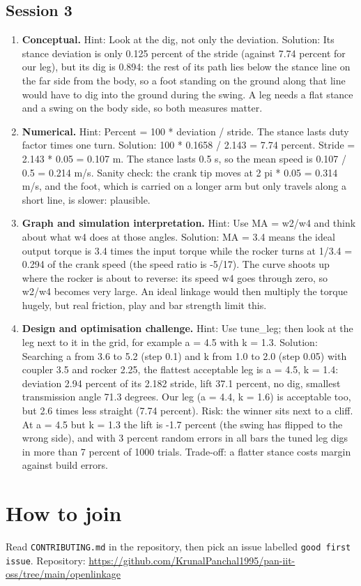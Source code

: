 \documentclass[11pt,a4paper]{article}
\begin{document}
\subsection*{Session 3}
\begin{enumerate}[nosep]
\item \textbf{Conceptual.} Hint: Look at the dig, not only the deviation. Solution: Its stance deviation is only 0.125 percent of the stride (against 7.74 percent for our leg), but its dig is 0.894: the rest of its path lies below the stance line on the far side from the body, so a foot standing on the ground along that line would have to dig into the ground during the swing. A leg needs a flat stance and a swing on the body side, so both measures matter.
\item \textbf{Numerical.} Hint: Percent = 100 * deviation / stride. The stance lasts duty factor times one turn. Solution: 100 * 0.1658 / 2.143 = 7.74 percent. Stride = 2.143 * 0.05 = 0.107 m. The stance lasts 0.5 s, so the mean speed is 0.107 / 0.5 = 0.214 m/s. Sanity check: the crank tip moves at 2 pi * 0.05 = 0.314 m/s, and the foot, which is carried on a longer arm but only travels along a short line, is slower: plausible.
\item \textbf{Graph and simulation interpretation.} Hint: Use MA = w2/w4 and think about what w4 does at those angles. Solution: MA = 3.4 means the ideal output torque is 3.4 times the input torque while the rocker turns at 1/3.4 = 0.294 of the crank speed (the speed ratio is -5/17). The curve shoots up where the rocker is about to reverse: its speed w4 goes through zero, so w2/w4 becomes very large. An ideal linkage would then multiply the torque hugely, but real friction, play and bar strength limit this.
\item \textbf{Design and optimisation challenge.} Hint: Use tune\_leg; then look at the leg next to it in the grid, for example a = 4.5 with k = 1.3. Solution: Searching a from 3.6 to 5.2 (step 0.1) and k from 1.0 to 2.0 (step 0.05) with coupler 3.5 and rocker 2.25, the flattest acceptable leg is a = 4.5, k = 1.4: deviation 2.94 percent of its 2.182 stride, lift 37.1 percent, no dig, smallest transmission angle 71.3 degrees. Our leg (a = 4.4, k = 1.6) is acceptable too, but 2.6 times less straight (7.74 percent). Risk: the winner sits next to a cliff. At a = 4.5 but k = 1.3 the lift is -1.7 percent (the swing has flipped to the wrong side), and with 3 percent random errors in all bars the tuned leg digs in more than 7 percent of 1000 trials. Trade-off: a flatter stance costs margin against build errors.
\end{enumerate}

\section{How to join}
Read \texttt{CONTRIBUTING.md} in the repository, then pick an issue labelled \texttt{good first issue}. Repository: \url{https://github.com/KrunalPanchal1995/pan-iit-oss/tree/main/openlinkage}
\end{document}
